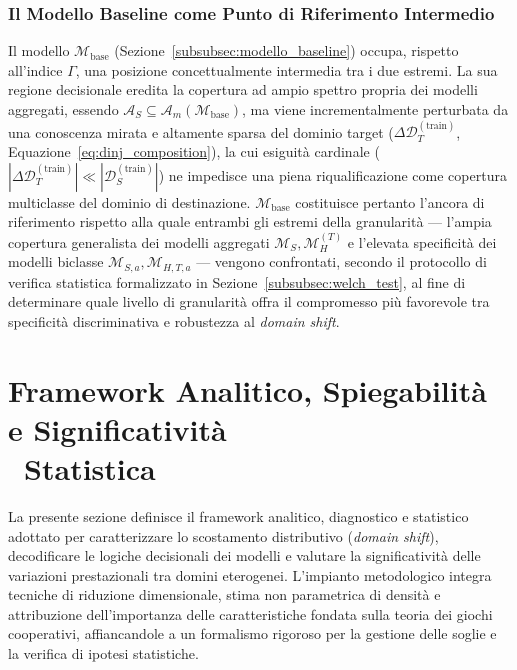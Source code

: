 \subsubsection{Il Modello Baseline come Punto di Riferimento Intermedio}
\label{subsubsec:baseline_riferimento_granularita}
Il modello $\mathcal{M}_{\text{base}}$ (Sezione~\ref{subsubsec:modello_baseline}) occupa, rispetto all'indice $\Gamma$, una posizione concettualmente intermedia tra i due estremi. La sua regione decisionale eredita la copertura ad ampio spettro propria dei modelli aggregati, essendo $\mathcal{A}_S \subseteq \mathcal{A}_m(\mathcal{M}_{\text{base}})$, ma viene incrementalmente perturbata da una conoscenza mirata e altamente sparsa del dominio target ($\Delta \mathcal{D}_T^{(\text{train})}$, Equazione~\eqref{eq:dinj_composition}), la cui esiguità cardinale ($|\Delta \mathcal{D}_{T}^{(\text{train})}| \ll |\mathcal{D}_{S}^{(\text{train})}|$) ne impedisce una piena riqualificazione come copertura multiclasse del dominio di destinazione. $\mathcal{M}_{\text{base}}$ costituisce pertanto l'ancora di riferimento rispetto alla quale entrambi gli estremi della granularità — l'ampia copertura generalista dei modelli aggregati $\mathcal{M}_S, \mathcal{M}_H^{(T)}$ e l'elevata specificità dei modelli biclasse $\mathcal{M}_{S,a}, \mathcal{M}_{H,T,a}$ — vengono confrontati, secondo il protocollo di verifica statistica formalizzato in Sezione~\ref{subsubsec:welch_test}, al fine di determinare quale livello di granularità offra il compromesso più favorevole tra specificità discriminativa e robustezza al \textit{domain shift}.

\section[Framework Analitico, Spiegabilità e Significatività Statistica]{Framework Analitico, Spiegabilità e Significatività \\\ Statistica}
\label{sec:framework_analitico}

La presente sezione definisce il framework analitico, diagnostico e statistico adottato per caratterizzare lo scostamento distributivo (\textit{domain shift}), decodificare le logiche decisionali dei modelli e valutare la significatività delle variazioni prestazionali tra domini eterogenei. 
L'impianto metodologico integra tecniche di riduzione dimensionale, stima non parametrica di densità e attribuzione dell'importanza delle caratteristiche fondata sulla teoria dei giochi cooperativi, affiancandole a un formalismo rigoroso per la gestione delle soglie e la verifica di ipotesi statistiche.

